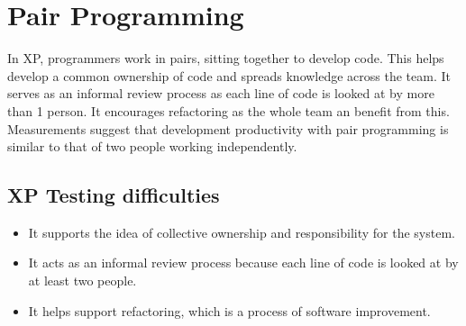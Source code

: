 \documentclass{report}
\begin{document}
\section{Pair Programming}
\noindent In XP, programmers work in pairs, sitting together to develop code. This helps develop a common ownership of code and spreads knowledge across the team. It serves as an informal review process as each line of code is looked at by more than 1 person. It encourages refactoring as the whole team an benefit from this. Measurements suggest that development productivity with pair programming is similar to that of two people working independently.

\subsection{XP Testing difficulties}
\begin{itemize}
  \item It supports the idea of collective ownership and responsibility for the system.
  \item It acts as an informal review process because each line of code is looked at by at least two people.
  \item It helps support refactoring, which is a process of software improvement.
\end{itemize}
\end{document}
